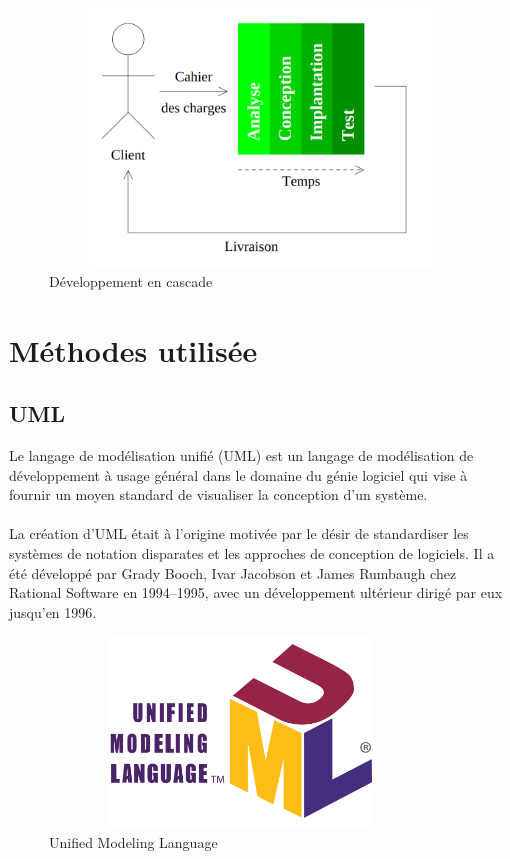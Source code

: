 \documentclass[12pt]{report}
\begin{document}
\begin{figure}[h]
\centering
    \includegraphics[width = 5in, height = 2.7in]{../Images/Analyse_Conception.png}
\caption{Développement en cascade}
\end{figure}

\newpage

\section{Méthodes utilisée}

\subsection{UML}
Le langage de modélisation unifié (UML) est un langage de modélisation de développement à usage général dans le domaine du génie logiciel qui vise à fournir un moyen standard de visualiser la conception d'un système.
\\\\
La création d'UML était à l'origine motivée par le désir de standardiser les systèmes de notation disparates et les approches de conception de logiciels. Il a été développé par Grady Booch, Ivar Jacobson et James Rumbaugh chez Rational Software en 1994–1995, avec un développement ultérieur dirigé par eux jusqu'en 1996.

\begin{figure}[h]
\centering
    \includegraphics[width = 4in, height = 2in]{../Images/UMLlogo.png}
\caption{Unified Modeling Language}
\end{figure}
\end{document}
